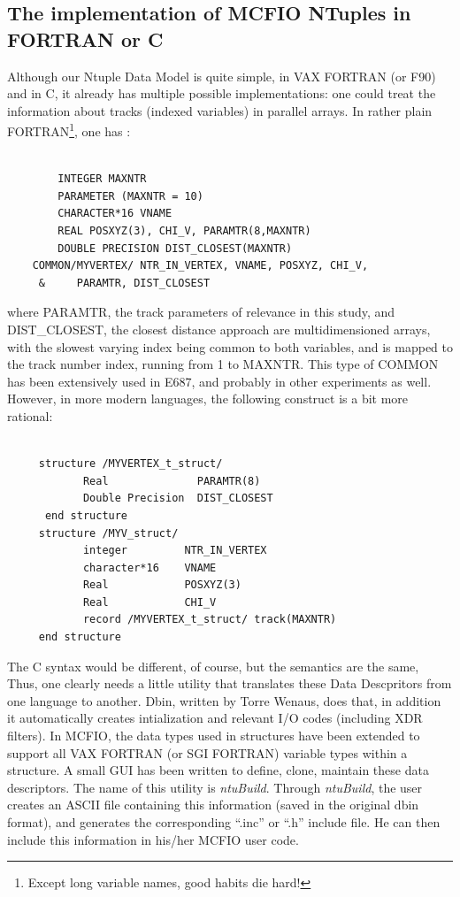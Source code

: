 \subsection{The implementation of MCFIO NTuples in FORTRAN or C}


Although our Ntuple Data Model is quite simple, in VAX FORTRAN (or F90)
and in C, it already has multiple possible implementations: one could treat
the information about tracks (indexed variables) in parallel arrays.  In
rather plain FORTRAN\footnote{Except long variable names, good habits die
hard!}, one has :
\begin{verbatim}

        INTEGER MAXNTR
        PARAMETER (MAXNTR = 10)
        CHARACTER*16 VNAME
        REAL POSXYZ(3), CHI_V, PARAMTR(8,MAXNTR)
        DOUBLE PRECISION DIST_CLOSEST(MAXNTR)
	COMMON/MYVERTEX/ NTR_IN_VERTEX, VNAME, POSXYZ, CHI_V,
     &     PARAMTR, DIST_CLOSEST

\end{verbatim}
where PARAMTR, the track parameters of relevance in this study, and
DIST\_CLOSEST, the closest distance approach are multidimensioned arrays, with
the slowest varying index being common to both variables, and is  mapped to the
track number index, running from 1 to MAXNTR.  This type of COMMON has been
extensively used in E687, and probably in other experiments as well.  However,
in more modern languages, the following construct is a bit  more rational:

\begin{verbatim}

     structure /MYVERTEX_t_struct/
            Real              PARAMTR(8)
            Double Precision  DIST_CLOSEST
      end structure
     structure /MYV_struct/
            integer         NTR_IN_VERTEX
            character*16    VNAME
            Real            POSXYZ(3)
            Real            CHI_V
            record /MYVERTEX_t_struct/ track(MAXNTR)
     end structure

\end{verbatim}

The C syntax would be different, of course, but the semantics are the same,
Thus, one clearly needs a little utility that translates these Data
Descpritors from one language to another. Dbin, written by Torre Wenaus,  does
that, in addition it automatically creates intialization and relevant I/O codes
(including XDR filters).  In MCFIO, the data types used in structures have been
extended to support all VAX FORTRAN (or SGI FORTRAN) variable types within a
structure.  A small GUI has been written to define, clone,  maintain these
data descriptors.  The name of this utility is {\em ntuBuild}.
 Through {\em ntuBuild}, the user creates an ASCII file
containing this information  (saved in the original dbin format), and generates
the corresponding ``.inc''  or ``.h'' include file. He can then include this
information in his/her MCFIO user code.

